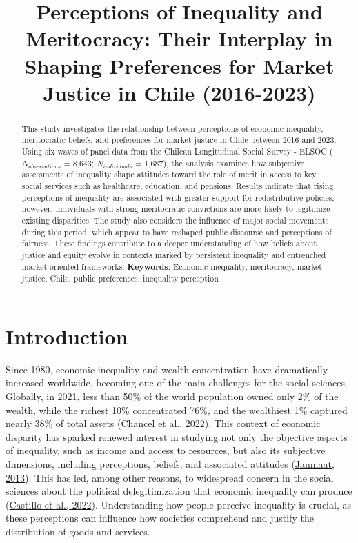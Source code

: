 \documentclass[
  12pt,
]{article}
\title{Perceptions of Inequality and Meritocracy: Their Interplay in
Shaping Preferences for Market Justice in Chile (2016-2023)}
\author{ }
\date{}
\begin{document}
\maketitle
\begin{abstract}
This study investigates the relationship between perceptions of economic
inequality, meritocratic beliefs, and preferences for market justice in
Chile between 2016 and 2023. Using six waves of panel data from the
Chilean Longitudinal Social Survey - ELSOC (\(N_{observations}\) =
8,643; \(N_{individuals}\) = 1,687), the analysis examines how
subjective assessments of inequality shape attitudes toward the role of
merit in access to key social services such as healthcare, education,
and pensions. Results indicate that rising perceptions of inequality are
associated with greater support for redistributive policies; however,
individuals with strong meritocratic convictions are more likely to
legitimize existing disparities. The study also considers the influence
of major social movements during this period, which appear to have
reshaped public discourse and perceptions of fairness. These findings
contribute to a deeper understanding of how beliefs about justice and
equity evolve in contexts marked by persistent inequality and entrenched
market-oriented frameworks. \newline \textbf{Keywords}: Economic
inequality, meritocracy, market justice, Chile, public preferences,
inequality perception
\end{abstract}
\ifdefined\Shaded\renewenvironment{Shaded}{\begin{tcolorbox}[frame hidden, enhanced, borderline west={3pt}{0pt}{shadecolor}, boxrule=0pt, breakable, sharp corners, interior hidden]}{\end{tcolorbox}}\fi

\hypertarget{introduction}{%
\section{Introduction}\label{introduction}}

Since 1980, economic inequality and wealth concentration have
dramatically increased worldwide, becoming one of the main challenges
for the social sciences. Globally, in 2021, less than 50\% of the world
population owned only 2\% of the wealth, while the richest 10\%
concentrated 76\%, and the wealthiest 1\% captured nearly 38\% of total
assets (\protect\hyperlink{ref-chancel_world_2022}{Chancel et al.,
2022}). This context of economic disparity has sparked renewed interest
in studying not only the objective aspects of inequality, such as income
and access to resources, but also its subjective dimensions, including
perceptions, beliefs, and associated attitudes
(\protect\hyperlink{ref-janmaat_subjective_2013}{Janmaat, 2013}). This
has led, among other reasons, to widespread concern in the social
sciences about the political delegitimization that economic inequality
can produce (\protect\hyperlink{ref-castillo_perception_2022}{Castillo
et al., 2022}). Understanding how people perceive inequality is crucial,
as these perceptions can influence how societies comprehend and justify
the distribution of goods and services.
\end{document}
